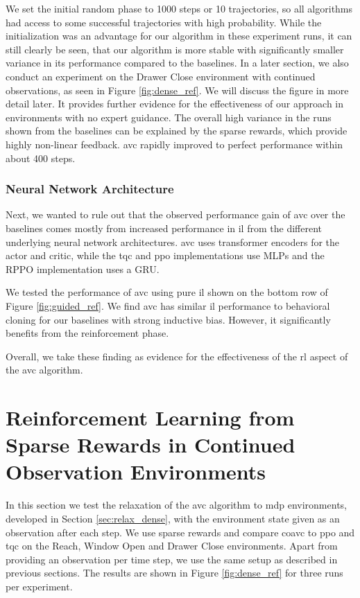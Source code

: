 We set the initial random phase to 1000 steps or 10 trajectories, so all algorithms had access to some successful trajectories with high probability. While the initialization was an advantage 
for our algorithm in these experiment runs, it can still clearly be seen, that our algorithm is more stable with significantly smaller variance in its performance compared to the baselines. In a later 
section, we also conduct an experiment on the Drawer Close environment with continued observations, as seen in Figure \ref{fig:dense_ref}. We will discuss the figure in more detail later. It provides 
further evidence for the effectiveness of our approach in environments with no expert guidance. The overall high variance in the runs shown from the baselines can be explained by the sparse rewards, which provide highly non-linear feedback. 
\ac{avc} rapidly improved to perfect performance within about 400 steps.

\subsubsection{Neural Network Architecture}
Next, we wanted to rule out that the observed performance gain of \ac{avc} over the baselines comes mostly from increased performance in \ac{il} 
from the different underlying neural network architectures. \ac{avc} uses transformer encoders for the actor and 
critic, while the \ac{tqc} and \ac{ppo} implementations use MLPs and the RPPO implementation uses a GRU.

We tested the performance of \ac{avc} using pure \ac{il} shown on the bottom row of
Figure \ref{fig:guided_ref}. We find \ac{avc} has similar \ac{il} performance to behavioral cloning for our baselines with strong inductive bias. However, it significantly benefits from the reinforcement phase.

Overall, we take these finding as evidence for the effectiveness of the \ac{rl} aspect of the \ac{avc} algorithm.


\section{Reinforcement Learning from Sparse Rewards in Continued Observation Environments}
\label{sec_exp_con_obs}
In this section we test the relaxation of the \ac{avc} algorithm to \ac{mdp} environments, developed in Section \ref{sec:relax_dense}, with the environment state given as an observation after each step.
We use sparse rewards 
and compare \ac{coavc} to \ac{ppo} and \ac{tqc} on the Reach, Window Open and Drawer Close environments. Apart from 
providing an observation per time step,
we use the same setup as described in previous sections. The results are shown in Figure \ref{fig:dense_ref} for three runs per experiment.


